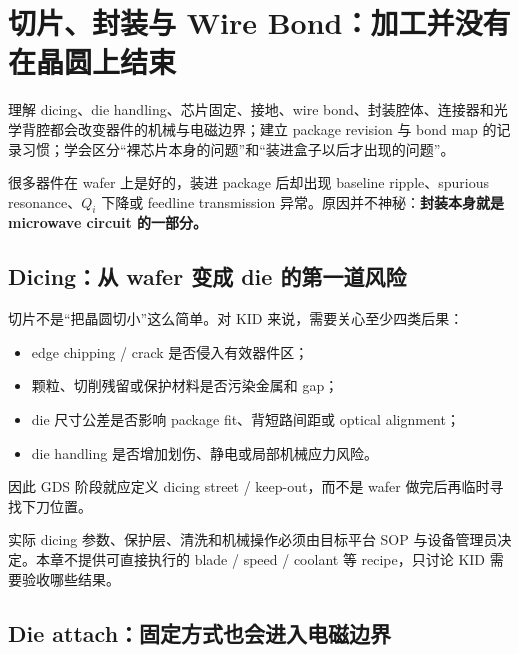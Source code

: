 \chapter{切片、封装与 Wire Bond：加工并没有在晶圆上结束}

\begin{chaptergoal}
理解 dicing、die handling、芯片固定、接地、wire bond、封装腔体、连接器和光学背腔都会改变器件的机械与电磁边界；建立 package revision 与 bond map 的记录习惯；学会区分“裸芯片本身的问题”和“装进盒子以后才出现的问题”。
\end{chaptergoal}

很多器件在 wafer 上是好的，装进 package 后却出现 baseline ripple、spurious resonance、$Q_i$ 下降或 feedline transmission 异常。原因并不神秘：\textbf{封装本身就是 microwave circuit 的一部分。}


\section{Dicing：从 wafer 变成 die 的第一道风险}

切片不是“把晶圆切小”这么简单。对 KID 来说，需要关心至少四类后果：

\begin{itemize}
  \item edge chipping / crack 是否侵入有效器件区；
  \item 颗粒、切削残留或保护材料是否污染金属和 gap；
  \item die 尺寸公差是否影响 package fit、背短路间距或 optical alignment；
  \item die handling 是否增加划伤、静电或局部机械应力风险。
\end{itemize}

因此 GDS 阶段就应定义 dicing street / keep-out，而不是 wafer 做完后再临时寻找下刀位置。

\begin{warningbox}
实际 dicing 参数、保护层、清洗和机械操作必须由目标平台 SOP 与设备管理员决定。本章不提供可直接执行的 blade / speed / coolant 等 recipe，只讨论 KID 需要验收哪些结果。
\end{warningbox}

\section{Die attach：固定方式也会进入电磁边界}

